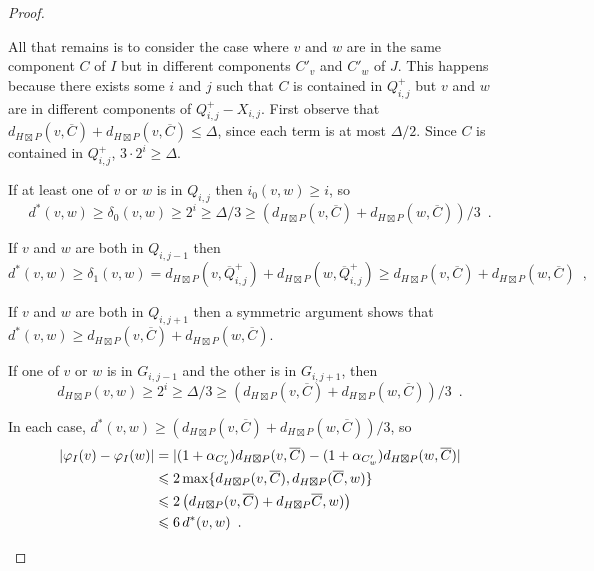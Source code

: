 \documentclass{patmorin}
\renewcommand{\ge}{\geqslant}
\renewcommand{\le}{\leqslant}
\begin{document}
\begin{proof}
\begin{compactenum}
    \item All that remains is to consider the case where $v$ and $w$ are in the same component $C$ of $I$ but in different components $C'_v$ and $C'_w$ of $J$.  This happens because there exists some $i$ and $j$ such that $C$ is contained in $Q^+_{i,j}$ but $v$ and $w$ are in different components of $Q^+_{i,j}-X_{i,j}$.  First observe that $d_{H\boxtimes P}(v,\overline{C})+d_{H\boxtimes P}(v,\overline{C})\le \Delta$, since each term is at most $\Delta/2$.  Since $C$ is contained in $Q^+_{i,j}$, $3\cdot 2^{i} \ge \Delta$.
    \begin{compactenum}[(a)]
      \item If at least one of $v$ or $w$ is in $Q_{i,j}$ then $i_0(v,w)\ge i$, so
      \[
        d^*(v,w)\ge \delta_0(v,w)\ge 2^i\ge \Delta/3 \ge (d_{H\boxtimes P}(v,\overline{C})+d_{H\boxtimes P}(w,\overline{C}))/3 \enspace .
      \]
      \item If $v$ and $w$ are both in $Q_{i,j-1}$ then
      \[
        d^*(v,w) \ge \delta_1(v,w)=d_{H\boxtimes P}(v,\overline{Q}^+_{i,j}) + d_{H\boxtimes P}(w,\overline{Q}^+_{i,j})\ge d_{H\boxtimes P}(v,\overline{C})+d_{H\boxtimes P}(w,\overline{C}) \enspace ,
      \]

      \item If $v$ and $w$ are both in $Q_{i,j+1}$ then a symmetric argument shows that $d^*(v,w)\ge d_{H\boxtimes P}(v,\overline{C})+d_{H\boxtimes P}(w,\overline{C})$.

      \item If one of $v$ or $w$ is in $G_{i,j-1}$ and the other is in $G_{i,j+1}$, then
      \[
        d_{H\boxtimes P}(v,w)
            \ge 2^i\ge\Delta/3
            \ge (d_{H\boxtimes P}(v,\overline{C})
                + d_{H\boxtimes P}(w,\overline{C}))/3 \enspace .
      \]
    \end{compactenum}
    In each case, $d^*(v,w)\ge (d_{H\boxtimes P}(v,\overline{C})+d_{H\boxtimes P}(w,\overline{C}))/3$, so
    \begin{align*}
        |\varphi_I(v)-\varphi_I(w)|
        & =|(1+\alpha_{C'_v})d_{H\boxtimes P}(v,\overline{C})-(1+\alpha_{C'_w})d_{H\boxtimes P}(w,\overline{C})| \\
        & \le 2\max\{d_{H\boxtimes P}(v,\overline{C}), d_{H\boxtimes P}(\overline{C},w)\} \\
        & \le 2\left(d_{H\boxtimes P}(v,\overline{C}) + d_{H\boxtimes P}\overline{C},w)\right) \\
        & \le 6\, d^*(v,w) \enspace . \qedhere
    \end{align*}
  \end{compactenum}
\end{proof}
\end{document}
